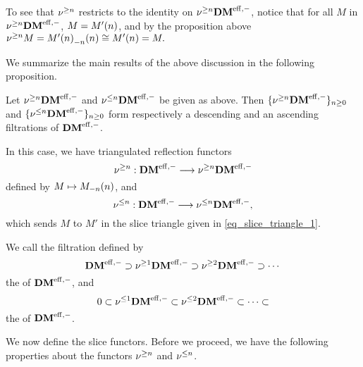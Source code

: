 To see that $\sgDM{n}$ restricts to the identity on $\sgDM{n} 
\DMeff$, notice that for all $M$ in $\sgDM{n} \DMeff$, $M = 
\tZ[n]{M'}$, and by the proposition above $\sgDM{n}M = 
\tZ[n]{\hZ[n]{\tZ[n]{M'}}} \cong \tZ[n]{M'} = M.$

We summarize the main results of the above discussion in the 
following proposition.

\begin{prop}\label{prop_slice_DMeff}
Let $\sgDM{n} \DMeff$ and $\slDM{n} \DMeff$ be given as above.
Then $\{\sgDM{n} \DMeff\}_{n \geq 0}$ and $\{\slDM{n} \DMeff\}_{n 
\geq 0}$ form respectively a descending and an ascending 
filtrations of $\DMeff$.

In this case, we have triangulated reflection functors 
\[
\sgDM{n}: \DMeff \to \sgDM{n}\DMeff
\] 
defined by $M \mapsto \tZ[n]{\hZ[n]{M}}$, and 
\[
\slDM{n}: \DMeff \to \slDM{n}\DMeff,
\]
which sends $M$ to $M'$ in the slice triangle given in 
\eqref{eq_slice_triangle_1}.
\end{prop}

\begin{defn}
We call the filtration defined by
\[
\DMeff \supset \sgDM{1}\DMeff \supset \sgDM{2}\DMeff \supset \cdots \\
\]
the  of $\DMeff$, and
\[
0 \subset \slDM{1}\DMeff \subset \slDM{2}\DMeff \subset \cdots \subset
\]
the  of $\DMeff$.
\end{defn}

We now define the slice functors. Before we proceed, we have the
following properties about the functors $\sgDM{n}$ and $\slDM{n}$.

